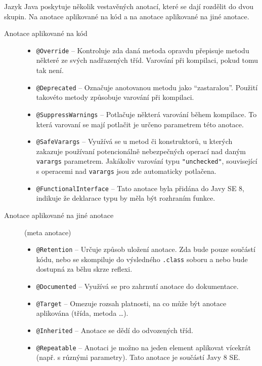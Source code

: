 Jazyk Java poskytuje několik vestavěných anotací, které se dají rozdělit do dvou skupin. Na anotace aplikované na kód a na anotace aplikované na jiné anotace.
\begin{description}
  \item[Anotace aplikované na kód]\hfill
  \begin{itemize}
     \item \texttt{@Override} -- Kontroluje zda daná metoda opravdu přepisuje metodu některé ze svých nadřazených tříd. Varování při kompilaci, pokud tomu tak není.
     \item \texttt{@Deprecated} -- Označuje anotovanou metodu jako "`zastaralou"'. Použití takovéto metody způsobuje varování při kompilaci.
     \item \texttt{@SuppressWarnings} -- Potlačuje některá varování během kompilace. To která varovaní se mají potlačit je určeno parametrem této anotace.
     \item \texttt{@SafeVarargs} -- Využívá se u metod či konstruktorů, u kterých zakazuje používaní potencionálně nebezpečných operací nad daným \texttt{varargs} parametrem. Jakákoliv varování typu \texttt{"unchecked"}, související s operacemi nad \texttt{varargs} jsou zde automaticky potlačena.
     \item \texttt{@FunctionalInterface} -- Tato anotace byla přidána do Javy SE 8, indikuje že deklarace typu by měla být rozhraním funkce.
  \end{itemize} 
  \item[Anotace aplikované na jiné anotace] (meta anotace)\hfill
  \begin{itemize}
    \item \texttt{@Retention} -- Určuje způsob uložení anotace. Zda bude pouze součástí kódu, nebo se skompiluje do výsledného \texttt{.class} soboru a nebo bude dostupná za běhu skrze reflexi.
    \item \texttt{@Documented} -- Využívá se pro zahrnutí anotace do dokumentace.
    \item \texttt{@Target} -- Omezuje rozsah platnosti, na co může být anotace aplikována (třída, metoda \ldots).
    \item \texttt{@Inherited} -- Anotace se dědí do odvozených tříd.
    \item \texttt{@Repeatable} -- Anotaci je možno na jeden element aplikovat vícekrát (např. s rúznými parametry). Tato anotace je součástí Javy 8 SE.
  \end{itemize}
\end{description}

